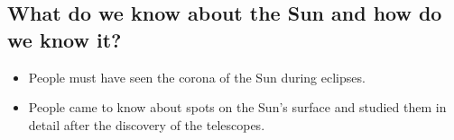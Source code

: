 \documentclass{../template/texnote}
\begin{document}
\subsection{What do we know about the Sun and how do we know it? }
\begin{itemize}
\item People must have seen the corona of the Sun during eclipses.
\item People came to know about spots on the Sun’s surface and studied them in detail after the discovery of the telescopes.
\end{itemize}


    \printbibliography
\end{document}
